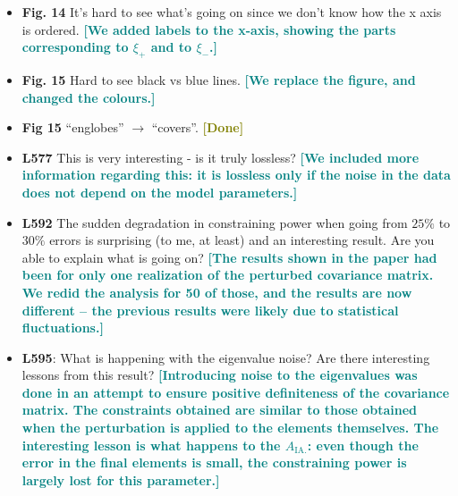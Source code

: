 \documentclass{article}
\newcommand\reply[1]{{\bf {\textcolor{teal}{[#1]}}}}
\newcommand\done{{\bf {\textcolor{olive}{[Done]}}}}
\begin{document}
\begin{itemize}
	\item \textbf{Fig. 14} It’s hard to see what’s going on since we don’t know how the x axis is ordered. \reply{We added labels to the x-axis, showing the parts corresponding to $\xi_+$ and to $\xi_-$.}
	\item \textbf{Fig. 15} Hard to see black vs blue lines. \reply{We replace the figure, and changed the colours.}
	\item \textbf{Fig 15} “englobes” $\rightarrow$ “covers”. \done
	\item \textbf{L577} This is very interesting - is it truly lossless? \reply{We included more information regarding this: it is lossless only if the noise in the data does not depend on the model parameters.}
	\item \textbf{L592} The sudden degradation in constraining power when going from $25\%$ to $30\%$ errors is surprising (to me, at least) and an interesting result. Are you able to explain what is going on? \reply{The results shown in the paper had been for only one realization of the perturbed covariance matrix. We redid the analysis for 50 of those, and the results are now different -- the previous results were likely due to statistical fluctuations.}
	\item \textbf{L595}: What is happening with the eigenvalue noise? Are there interesting lessons from this result? \reply{Introducing noise to the eigenvalues was done in an attempt to ensure positive definiteness of the covariance matrix. The constraints obtained are similar to those obtained when the perturbation is applied to the elements themselves. The interesting lesson is what happens to the $A_{\mathrm{IA}.}$: even though the error in the final elements is small, the constraining power is largely lost for this parameter.}

\end{itemize}
\end{document}
